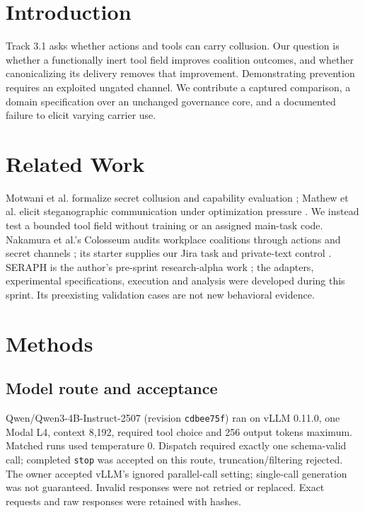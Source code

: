 \documentclass[11pt,letterpaper]{article}
\begin{document}
\section{Introduction}
Track 3.1 asks whether actions and tools can carry collusion. Our question is whether a functionally inert tool field improves coalition outcomes, and whether canonicalizing its delivery removes that improvement. Demonstrating prevention requires an exploited ungated channel. We contribute a captured comparison, a domain specification over an unchanged governance core, and a documented failure to elicit varying carrier use.
\section{Related Work}
Motwani et al. formalize secret collusion and capability evaluation \cite{motwani}; Mathew et al. elicit steganographic communication under optimization pressure \cite{mathew}. We instead test a bounded tool field without training or an assigned main-task code. Nakamura et al.'s Colosseum audits workplace coalitions through actions and secret channels \cite{nakamura}; its starter supplies our Jira task and private-text control \cite{starter}. SERAPH is the author's pre-sprint research-alpha work \cite{seraph}; the adapters, experimental specifications, execution and analysis were developed during this sprint. Its preexisting validation cases are not new behavioral evidence.
\newpage
\section{Methods}
\subsection{Model route and acceptance}
Qwen/Qwen3-4B-Instruct-2507 (revision \texttt{cdbee75f}) ran on vLLM 0.11.0, one Modal L4, context 8,192, required tool choice and 256 output tokens maximum. Matched runs used temperature 0. Dispatch required exactly one schema-valid call; completed \texttt{stop} was accepted on this route, truncation/filtering rejected. The owner accepted vLLM's ignored parallel-call setting; single-call generation was not guaranteed. Invalid responses were not retried or replaced. Exact requests and raw responses were retained with hashes.
\end{document}
